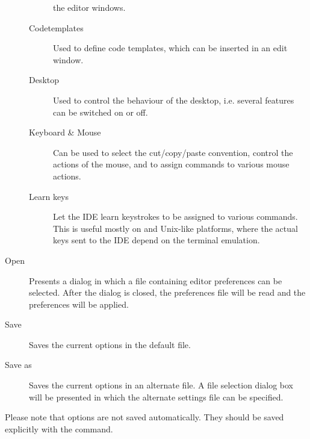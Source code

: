 \begin{description}
\begin{description}
the editor windows.
\item[Codetemplates]
Used to define code templates, which can be inserted in an edit window.
\item[Desktop]
Used to control the behaviour of the desktop, i.e. several features can be
switched on or off.
\item[Keyboard \& Mouse] Can be used to select the cut/copy/paste
convention, control the actions of the mouse, and to assign commands 
to various mouse actions.
\item[Learn keys] Let the IDE learn keystrokes to be assigned to various 
commands. This is useful mostly on \linux and Unix-like platforms, where the
actual keys sent to the IDE depend on the terminal emulation.
\end{description}
\item[Open]
Presents a dialog in which a file containing editor preferences can be selected.
After the dialog is closed, the preferences file will be read and the
preferences will be applied.
\item[Save]
Saves the current options in the default file.
\item[Save as]
Saves the current options in an alternate file. A file selection dialog box
will be presented in which the alternate settings file can be specified.
\end{description}
Please note that options are not saved automatically. They should be saved
explicitly with the  command.
%
%
